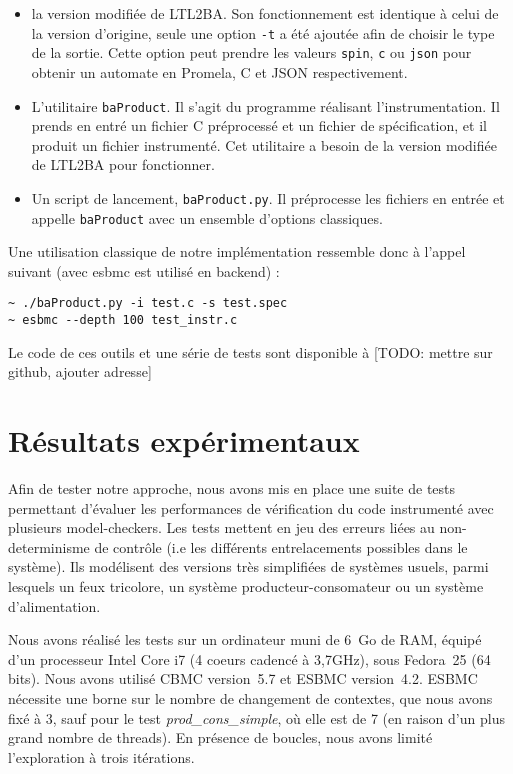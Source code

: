 \begin{itemize}
\item
  la version modifiée de LTL2BA. Son fonctionnement est identique à
  celui de la version d'origine, seule une option \texttt{-t} a été
  ajoutée afin de choisir le type de la sortie. Cette option peut
  prendre les valeurs \texttt{spin}, \texttt{c} ou
  \texttt{json} pour obtenir un automate en Promela, C et JSON
  respectivement.
\item
  L'utilitaire \texttt{baProduct}. Il s'agit du programme réalisant
  l'instrumentation. Il prends en entré un fichier C préprocessé et un
  fichier de spécification, et il produit un fichier instrumenté. Cet
  utilitaire a besoin de la version modifiée de LTL2BA pour fonctionner.
\item
  Un script de lancement, \texttt{baProduct.py}. Il préprocesse les
  fichiers en entrée et appelle \texttt{baProduct} avec un ensemble
  d'options classiques.
\end{itemize}

Une utilisation classique de notre implémentation ressemble donc à
l'appel suivant (avec esbmc\cite{ESBMC} est utilisé en backend) :

\begin{lstlisting}
~ ./baProduct.py -i test.c -s test.spec
~ esbmc --depth 100 test_instr.c
\end{lstlisting}

Le code de ces outils et une série de tests sont disponible à {[}TODO:
mettre sur github, ajouter adresse{]}

\section{Résultats expérimentaux}

Afin de tester notre approche, nous avons mis en place une suite de tests
permettant d'évaluer les performances de vérification du code instrumenté avec
plusieurs model-checkers. Les tests mettent en jeu des erreurs liées au
non-determinisme de contrôle (i.e les différents entrelacements possibles dans
le système). Ils modélisent des versions très simplifiées de systèmes usuels,
parmi lesquels un feux tricolore, un système producteur-consomateur ou un
système d'alimentation.

Nous avons réalisé les tests sur un ordinateur muni de 6~Go de RAM, équipé d'un
processeur Intel Core i7 (4 coeurs cadencé à 3,7GHz), sous Fedora~25 (64 bits).
Nous avons utilisé CBMC\cite{CBMC} version~5.7 et ESBMC\cite{ESBMC} version~4.2.
ESBMC nécessite une borne sur le nombre de changement de contextes, que nous
avons fixé à 3, sauf pour le test \emph{prod\_cons\_simple}, où elle est de 7
(en raison d'un plus grand nombre de threads). En présence de boucles, nous
avons limité l'exploration à trois itérations.

